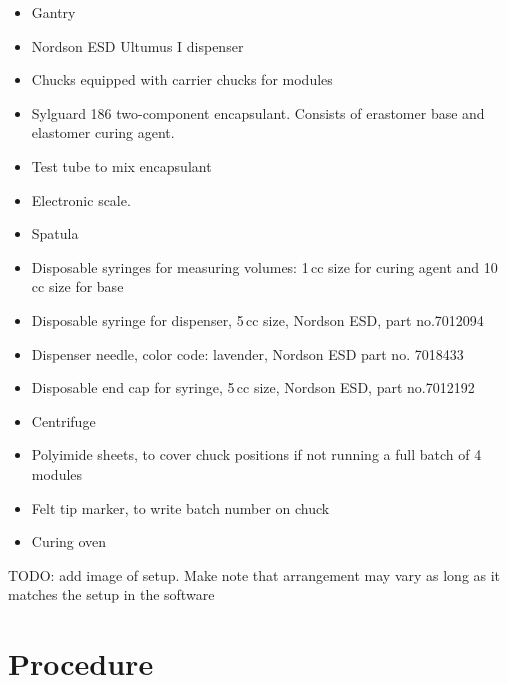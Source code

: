\documentclass[12pt]{unlsilabsop}
\begin{document}
\begin{itemize}
    \item Gantry
    \item Nordson ESD Ultumus I dispenser
    \item Chucks equipped with carrier chucks for modules
    \item Sylguard 186 two-component encapsulant. Consists of erastomer base and elastomer curing agent.
    \item Test tube to mix encapsulant
    \item Electronic scale.
    \item Spatula
    \item Disposable syringes for measuring volumes: 1\,cc size for curing agent and 10\,cc size for base
    \item Disposable syringe for dispenser, 5\,cc size, Nordson ESD, part no.7012094
    \item Dispenser needle, color code: lavender, Nordson ESD part no. 7018433
    \item Disposable end cap for syringe, 5\,cc size, Nordson ESD, part no.7012192
    \item Centrifuge
    \item Polyimide sheets, to cover chuck positions if not running a full batch of 4 modules
    \item Felt tip marker, to write batch number on chuck
    \item Curing oven
\end{itemize}

TODO: add image of setup. Make note that arrangement may vary as long as it matches the setup in the software

\section{Procedure}
\end{document}
